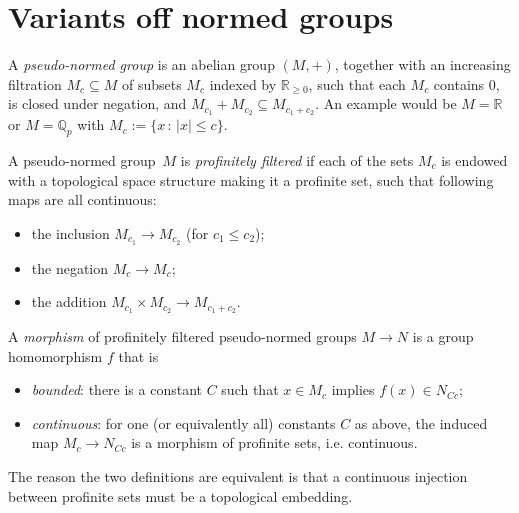 \section{Variants off normed groups}

\begin{definition}
  \label{pseudo_normed_group}
  \leanok
  A \emph{pseudo-normed group} is an abelian group $(M,+)$,
  together with an increasing filtration $M_c \subseteq M$ of subsets $M_c$ indexed by $\mathbb R_{\ge 0}$,
  such that each $M_c$ contains $0$, is closed under negation,
  and $M_{c_1} + M_{c_2} \subseteq M_{c_1 + c_2}$. An example would be $M=\mathbb{R}$ or $M=\mathbb{Q}_p$ with $M_c :=\{x\,:\,|x|\leq c\}$.

  A pseudo-normed group~$M$ is \emph{profinitely filtered}
  if each of the sets $M_c$ is endowed with a topological space structure
  making it a profinite set, such that following maps are all continuous:
  \begin{itemize}
    \item the inclusion $M_{c_1} \to M_{c_2}$ (for $c_1 \le c_2$);
    \item the negation $M_c \to M_c$;
    \item the addition $M_{c_1} \times M_{c_2} \to M_{c_1 + c_2}$.
  \end{itemize}

  
  A \emph{morphism} of profinitely filtered pseudo-normed groups $M \to N$
  is a group homomorphism $f$ that is
  \begin{itemize}
    \item \emph{bounded}:
      there is a constant $C$
      such that $x \in M_c$ implies $f(x) \in N_{Cc}$;
    \item \emph{continuous}:
      for one (or equivalently all) constants $C$ as above,
      the induced map $M_c \to N_{Cc}$ is
      a morphism of profinite sets, i.e. continuous.
  \end{itemize}

  The reason the two definitions are equivalent is that a continuous injection between profinite sets must be a topological embedding.
\end{definition}

